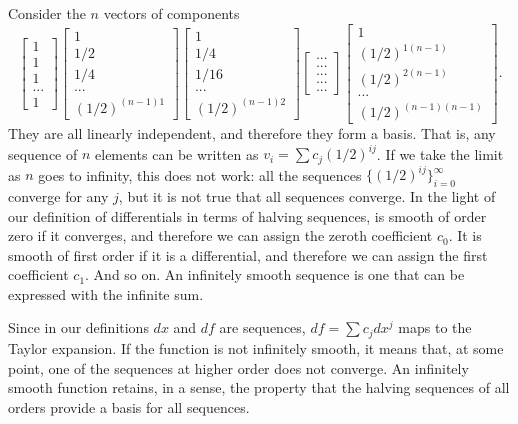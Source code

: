 \begin{remark}
	Consider the $n$ vectors of components
	$$ \left[\begin{array}{c} 1\\ 1\\ 1\\ ...\\ 1 \end{array}\right] 
	\left[\begin{array}{c} 1\\ 1/2\\ 1/4\\ ...\\ (1/2)^{(n-1)1} \end{array}\right]
	\left[\begin{array}{c} 1\\ 1/4\\ 1/16\\ ...\\ (1/2)^{(n-1)2} \end{array}\right]
	\left[\begin{array}{c} ...\\ ...\\ ...\\ ...\\ ... \end{array}\right]
	\left[\begin{array}{c} 1\\ (1/2)^{1(n-1)}\\ (1/2)^{2(n-1)}\\ ...\\ (1/2)^{(n-1)(n-1)} \end{array}\right].$$
	They are all linearly independent, and therefore they form a basis. That is, any sequence of $n$ elements can be written as $v_i = \sum c_j (1/2)^{ij}$. If we take the limit as $n$ goes to infinity, this does not work: all the sequences $\{(1/2)^{ij}\}_{i=0}^\infty$ converge for any $j$, but it is not true that all sequences converge. In the light of our definition of differentials in terms of halving sequences, is smooth of order zero if it converges, and therefore we can assign the zeroth coefficient $c_0$. It is smooth of first order if it is a differential, and therefore we can assign the first coefficient $c_1$. And so on. An infinitely smooth sequence is one that can be expressed with the infinite sum.
	
	Since in our definitions $dx$ and $df$ are sequences, $df = \sum c_j dx^j$ maps to the Taylor expansion. If the function is not infinitely smooth, it means that, at some point, one of the sequences at higher order does not converge. An infinitely smooth function retains, in a sense, the property that the halving sequences of all orders provide a basis for all sequences.
\end{remark}


